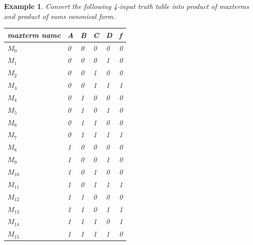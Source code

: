 \documentclass{article}
\newtheorem{example}{Example}
\begin{document}
\begin{example}
  Convert the following 4-input truth table into product of maxterms and product of sums canonical form.

  \noindent
  \begin{tabular}{p{20mm}llll|l}
    \toprule
    maxterm name & A & B & C & D & f \\
    \midrule
    $M_0$ & 0 & 0 & 0 & 0 & 0 \\ 
    $M_1$ & 0 & 0 & 0 & 1 & 0 \\ 
    $M_2$ & 0 & 0 & 1 & 0 & 0 \\ 
    $M_3$ & 0 & 0 & 1 & 1 & 1 \\ 
    $M_4$ & 0 & 1 & 0 & 0 & 0 \\ 
    $M_5$ & 0 & 1 & 0 & 1 & 0 \\ 
    $M_6$ & 0 & 1 & 1 & 0 & 0 \\ 
    $M_7$ & 0 & 1 & 1 & 1 & 1 \\ 
    $M_8$ & 1 & 0 & 0 & 0 & 0 \\ 
    $M_9$ & 1 & 0 & 0 & 1 & 0 \\ 
    $M_{10}$ & 1 & 0 & 1 & 0 & 0 \\
    $M_{11}$ & 1 & 0 & 1 & 1 & 1 \\
    $M_{12}$ & 1 & 1 & 0 & 0 & 0 \\
    $M_{13}$ & 1 & 1 & 0 & 1 & 1 \\
    $M_{14}$ & 1 & 1 & 1 & 0 & 1 \\
    $M_{15}$ & 1 & 1 & 1 & 1 & 0 \\
    \bottomrule
  \end{tabular}
\end{example}
\end{document}
